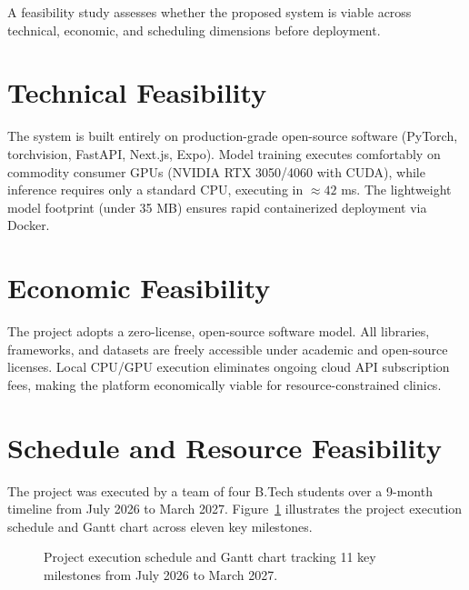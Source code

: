 \documentclass[12pt,a4paper]{report}
\begin{document}
A feasibility study assesses whether the proposed system is viable across technical, economic, and scheduling dimensions before deployment.

\section{Technical Feasibility}
The system is built entirely on production-grade open-source software (PyTorch, torchvision, FastAPI, Next.js, Expo). Model training executes comfortably on commodity consumer GPUs (NVIDIA RTX 3050/4060 with CUDA), while inference requires only a standard CPU, executing in $\approx 42$ ms. The lightweight model footprint (under 35 MB) ensures rapid containerized deployment via Docker.

\section{Economic Feasibility}
The project adopts a zero-license, open-source software model. All libraries, frameworks, and datasets are freely accessible under academic and open-source licenses. Local CPU/GPU execution eliminates ongoing cloud API subscription fees, making the platform economically viable for resource-constrained clinics.

\section{Schedule and Resource Feasibility}
The project was executed by a team of four B.Tech students over a 9-month timeline from July 2026 to March 2027. Figure~\ref{fig:project_gantt} illustrates the project execution schedule and Gantt chart across eleven key milestones.

\begin{figure}[H]
    \centering
    \caption{Project execution schedule and Gantt chart tracking 11 key milestones from July 2026 to March 2027.}
    \label{fig:project_gantt}
\end{figure}
\end{document}
